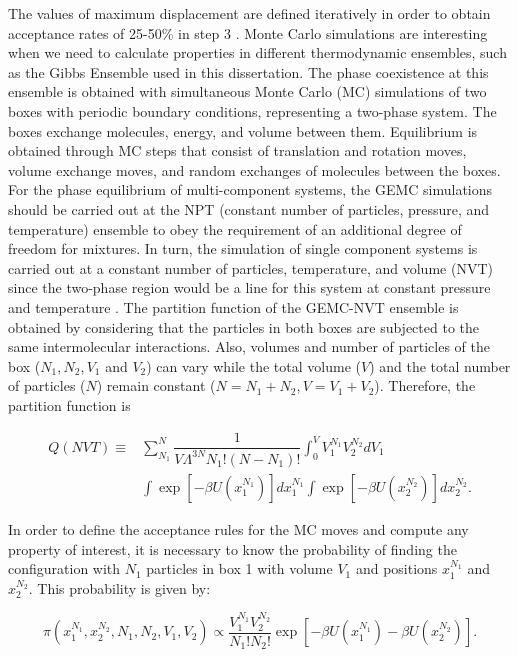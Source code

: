 The values of maximum displacement are defined iteratively in order to obtain acceptance rates of 25-50\% in step 3   \cite{Frenkel2013}. Monte Carlo simulations are interesting when we need to calculate properties in different thermodynamic ensembles, such as the Gibbs Ensemble used in this dissertation. The phase coexistence at this ensemble is obtained with simultaneous Monte Carlo (MC) simulations of two boxes with periodic boundary conditions, representing a two-phase system. The boxes exchange molecules, energy, and volume between them. Equilibrium is obtained through MC steps that consist of translation and rotation moves, volume exchange moves, and random exchanges of molecules between the boxes. For the phase equilibrium of multi-component systems, the GEMC simulations should be carried out at the NPT (constant number of particles, pressure, and temperature) ensemble to obey the requirement of an additional degree of freedom for mixtures. In turn, the simulation of single component systems is carried out at a constant number of particles, temperature, and volume (NVT) since the two-phase region would be a line for this system at constant pressure and temperature \cite{frenkel}. The partition function of the GEMC-NVT ensemble is obtained by considering that the particles in both boxes are subjected to the same intermolecular interactions. Also, volumes and number of particles of the box ($N_{1}$,$\, N_{2}$,$\, V_{1}$ and $V_{2}$) can vary while the total volume ($V$) and the total number of particles ($N$) remain constant ($N = N_{1} + N_{2}$,$\, V = V_{1} + V_{2}$). Therefore, the partition function is

\begin{equation}
\begin{aligned}
Q(NVT) {} \equiv & \sum_{N_{1}}^{N} \dfrac{1}{V \Lambda ^{3N} N_{1}!(N-N_{1})!} \int_{0}^{V} V_{1}^{N_{1}} V_{2}^{N_{2}} dV_{1} \\
& \int  \exp[-\beta U(x_{1}^{N_{1}})] dx_{1}^{N_{1}} \int  \exp[-\beta U(x_{2}^{N_{2}})] dx_{2}^{N_{2}}.
\end{aligned}
\label{eqn:gepart}
\end{equation}

In order to define the acceptance rules for the MC moves and compute any property of interest, it is necessary to know the probability of finding the configuration with $N_{1}$ particles in box 1 with volume $V_{1}$ and positions $x_{1}^{N_{1}}$ and $x_{2}^{N_{2}}$. This probability is given by:

\begin{equation}
\pi(x_{1}^{N_{1}},x_{2}^{N_{2}},N_{1},N_{2},V_{1},V_{2}) \propto \dfrac{V_{1}^{N_{1}}V_{2}^{N_{2}}}{N_{1}!N_{2}!} \exp[-\beta U(x_{1}^{N_{1}}) -\beta U(x_{2}^{N_{2}})] .
\label{eqn:geprob}
\end{equation}

